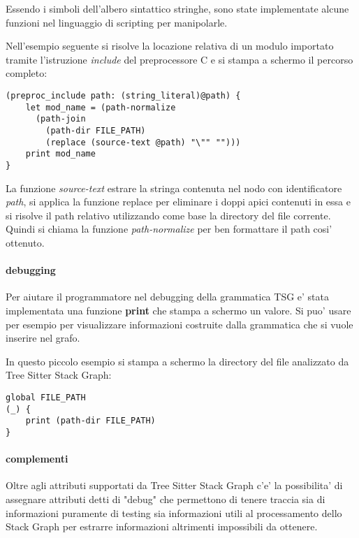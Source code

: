 Essendo i simboli dell'albero sintattico stringhe, sono state implementate alcune funzioni nel linguaggio di scripting per manipolarle.

Nell'esempio seguente si risolve la locazione relativa di un modulo importato tramite l'istruzione \emph{include} del preprocessore C e si stampa a schermo il percorso completo:

\begin{verbatim}
(preproc_include path: (string_literal)@path) {
    let mod_name = (path-normalize
      (path-join
        (path-dir FILE_PATH)
        (replace (source-text @path) "\"" "")))
    print mod_name
}
\end{verbatim}

La funzione \emph{source-text} estrare la stringa contenuta nel nodo con identificatore \emph{path}, si applica la funzione replace per eliminare i doppi apici contenuti in essa e si risolve il path relativo utilizzando come base la directory del file corrente.
Quindi si chiama la funzione \emph{path-normalize} per ben formattare il path cosi' ottenuto.

\paragraph{debugging}

Per aiutare il programmatore nel debugging della grammatica TSG e' stata implementata una funzione \textbf{print} che stampa a schermo un valore.
Si puo' usare per esempio per visualizzare informazioni costruite dalla grammatica che si vuole inserire nel grafo.

In questo piccolo esempio si stampa a schermo la directory del file analizzato da Tree Sitter Stack Graph:

\begin{verbatim}
global FILE_PATH
(_) {
    print (path-dir FILE_PATH)
}
\end{verbatim}

\paragraph{complementi}

Oltre agli attributi supportati da Tree Sitter Stack Graph c'e' la possibilita' di assegnare attributi detti di "debug" che permettono di tenere traccia sia di informazioni puramente di testing sia informazioni utili al processamento dello Stack Graph per estrarre informazioni altrimenti impossibili da ottenere.

